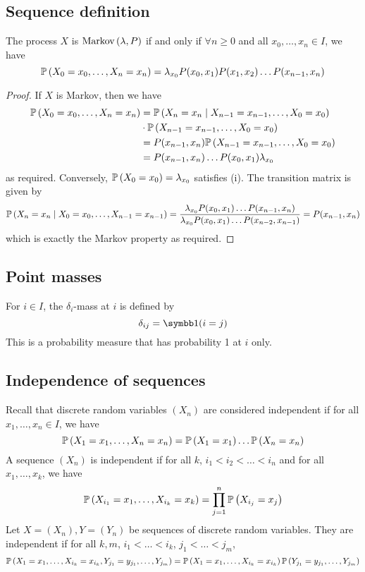\subsection{Sequence definition}
\begin{theorem}
	The process \( X \) is \( \operatorname{Markov}\left({\lambda, P}\right) \) if and only if \( \forall n \geq 0 \) and all \( x_0, \dots, x_n \in I \), we have
	\[
		\mathbb{P}\left({X_0 = x_0, \dots, X_n = x_n}\right) = \lambda_{x_0} P(x_0, x_1) P(x_1, x_2) \dots P(x_{n-1}, x_n)
	\]
\end{theorem}
\begin{proof}
	If \( X \) is Markov, then we have
	\begin{align*}
		\mathbb{P}\left({X_0 = x_0, \dots, X_n = x_n}\right) & = \mathbb{P}\left({X_n = x_n \mid X_{n-1} = x_{n-1}, \dots, X_0 = x_0}\right)  \\
		                                   & \cdot \mathbb{P}\left({X_{n-1} = x_{n-1}, \dots, X_0 = x_0}\right)             \\
		                                   & = P(x_{n-1}, x_n) \mathbb{P}\left({X_{n-1} = x_{n-1}, \dots, X_0 = x_0}\right) \\
		                                   & = P(x_{n-1}, x_n) \dots P(x_0, x_1) \lambda_{x_0}
	\end{align*}
	as required.
	Conversely, \( \mathbb{P}\left({X_0 = x_0}\right) = \lambda_{x_0} \) satisfies (i).
	The transition matrix is given by
	\[
		\mathbb{P}\left({X_n = x_n \mid X_0 = x_0, \dots, X_{n-1} = x_{n-1}}\right) = \frac{\lambda_{x_0} P(x_0, x_1) \dots P(x_{n-1}, x_n)}{\lambda_{x_0} P(x_0, x_1) \dots P(x_{n-2}, x_{n-1})} = P(x_{n-1}, x_n)
	\]
	which is exactly the Markov property as required.
\end{proof}

\subsection{Point masses}
\begin{definition}
	For \( i \in I \), the \( \delta_i \)-mass at \( i \) is defined by
	\[
		\delta_{ij} = \symbb 1 (i = j)
	\]
	This is a probability measure that has probability 1 at \( i \) only.
\end{definition}

\subsection{Independence of sequences}
Recall that discrete random variables \( (X_n) \) are considered independent if for all \( x_1, \dots, x_n \in I \), we have
\[
	\mathbb{P}\left({X_1 = x_1, \dots, X_n = x_n}\right) = \mathbb{P}\left({X_1 = x_1}\right)\dots\mathbb{P}\left({X_n = x_n}\right)
\]
A sequence \( (X_n) \) is independent if for all \( k \), \( i_1 < i_2 < \dots < i_n \) and for all \( x_1, \dots, x_k \), we have
\[
	\mathbb{P}\left({X_{i_1} = x_1, \dots, X_{i_k} = x_k}\right) = \prod_{j=1}^n \mathbb{P}\left({X_{i_j} = x_j}\right)
\]
Let \( X = (X_n), Y = (Y_n) \) be sequences of discrete random variables.
They are independent if for all \(k,m\), \( i_1 < \dots < i_k \), \( j_1 < \dots < j_m \),
\[
	\mathbb{P}\left({X_1 = x_1, \dots, X_{i_k} = x_{i_k}, Y_{j_1} = y_{j_1}, \dots, Y_{j_m}}\right) = \mathbb{P}\left({X_1 = x_1, \dots, X_{i_k} = x_{i_k}}\right) \mathbb{P}\left({Y_{j_1} = y_{j_1}, \dots, Y_{j_m}}\right)
\]

